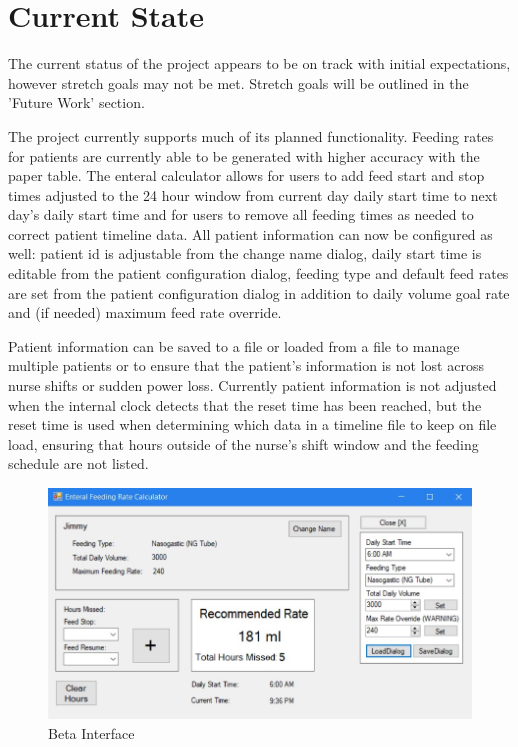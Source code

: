 \documentclass[onecolumn, draftclsnofoot,10pt, compsoc]{IEEEtran}
\begin{document}
\section{Current State}
The current status of the project appears to be on track with initial expectations, however stretch goals may not be met. Stretch goals will be outlined in the 'Future Work' section.

The project currently supports much of its planned functionality.
Feeding rates for patients are currently able to be generated with higher accuracy with the paper table.
The enteral calculator allows for users to add feed start and stop times adjusted to the 24 hour window from current day daily start time to next day's daily start time and for users to remove all feeding times as needed to correct patient timeline data.
All patient information can now be configured as well: patient id is adjustable from the change name dialog, daily start time is editable from the patient configuration dialog, feeding type and default feed rates are set from the patient configuration dialog in addition to daily volume goal rate and (if needed) maximum feed rate override.

Patient information can be saved to a file or loaded from a file to manage multiple patients or to ensure that the patient's information is not lost across nurse shifts or sudden power loss.
Currently patient information is not adjusted when the internal clock detects that the reset time has been reached, but the reset time is used when determining which data in a timeline file to keep on file load, ensuring that hours outside of the nurse's shift window and the feeding schedule are not listed.

\begin{figure}[htp]
    \centering
    \includegraphics[width=17cm]{betainterface}
    \caption{Beta Interface}
    \label{fig:Beta}
\end{figure}
\end{document}
